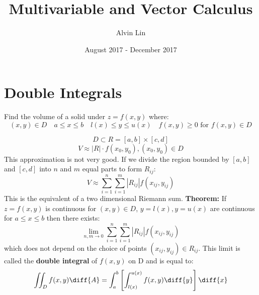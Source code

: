 \documentclass[letterpaper, 12pt]{math}
\title{Multivariable and Vector Calculus}
\author{Alvin Lin}
\date{August 2017 - December 2017}
\begin{document}
\maketitle

\section*{Double Integrals}
Find the volume of a solid under \( z = f(x,y) \) where:
\[ (x,y)\in D \quad a\le x\le b \quad l(x)\le y\le u(x) \quad
  f(x,y)\ge 0\text{ for }f(x,y)\in D \]
\begin{center}
\end{center}
\[ D \subset R = [a,b]\times[c,d] \]
\[ V \approx |R|\cdot f(x_0,y_0), (x_0,y_0)\in D \]
This approximation is not very good. If we divide the region bounded by
\( [a,b] \) and \( [c,d] \) into \( n \) and \( m \) equal parts to form
\( R_{ij} \):
\[ V \approx \sum_{i=1}^{n}\sum_{i=1}^{m}|R_{ij}|f(x_{ij},y_{ij}) \]
This is the equivalent of a two dimensional Riemann sum.
\textbf{Theorem:} If \( z = f(x,y) \) is continuous for \( (x,y)\in D \),
\( y = l(x), y = u(x) \) are continuous for \( a\le x\le b \) then there
exists:
\[ \lim_{n,m\to0}\sum_{i=1}^{n}\sum_{i=1}^{m}|R_{ij}|f(x_{ij},y_{ij}) \]
which does not depend on the choice of points \( (x_{ij},y_{ij})\in R_{ij} \).
This limit is called the \textbf{double integral} of \( f(x,y) \) on D and
is equal to:
\[ \iint_{D}f(x,y)\diff{A} =
  \int_{a}^{b}\left[\int_{l(x)}^{u(x)}f(x,y)\diff{y}\right]\diff{x} \]
\end{document}
